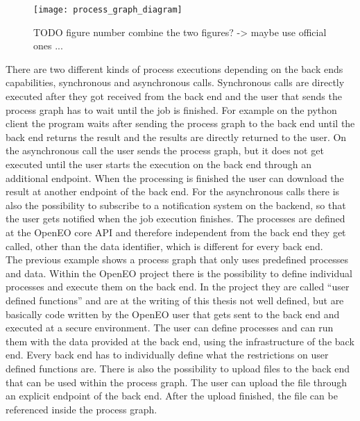 \documentclass[draft,final]{vutinfth} %
\begin{document}
\begin{figure}[h]
	\centering
	\texttt{[image: process\_graph\_diagram]}
	\caption{TODO figure number combine the two figures? -> maybe use official ones ...}
	\label{fig:process_graph_diagram} %
\end{figure}

There are two different kinds of process executions depending on the back ends capabilities, synchronous and asynchronous calls. Synchronous calls are directly executed after they got received from the back end and the user that sends the process graph has to wait until the job is finished. For example on the python client the program waits after sending the process graph to the back end until the back end returns the result and the results are directly returned to the user. On the asynchronous call the user sends the process graph, but it does not get executed until the user starts the execution on the back end through an additional endpoint. When the processing is finished the user can download the result at another endpoint of the back end. For the asynchronous calls there is also the possibility to subscribe to a notification system on the backend, so that the user gets notified when the job execution finishes.     
The processes are defined at the OpenEO core API and therefore independent from the back end they get called, other than the data identifier, which is different for every back end.  
\\
The previous example shows a process graph that only uses predefined processes and data. Within the OpenEO project there is the possibility to define individual processes and execute them on the back end. In the project they are called “user defined functions” and are at the writing of this thesis not well defined, but are basically code written by the OpenEO user that gets sent to the back end and executed at a secure environment. The user can define processes and can run them with the data provided at the back end, using the infrastructure of the back end. Every back end has to individually define what the restrictions on user defined functions are. 
There is also the possibility to upload files to the back end that can be used within the process graph. The user can upload the file through an explicit endpoint of the back end. After the upload finished, the file can be referenced inside the process graph.
\end{document}
